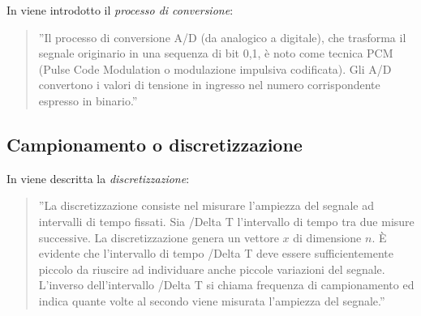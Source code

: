 \documentclass[a4paper]{report} %
\begin{document}
In \cite{art:rif.7} viene introdotto il \textit{processo di conversione}: 
\begin{quote}
	''Il processo di conversione A/D (da analogico a digitale), che trasforma il segnale originario in una sequenza di bit {0,1}, è noto come tecnica PCM (Pulse Code Modulation o modulazione impulsiva codificata). Gli A/D convertono i valori di tensione in ingresso nel numero corrispondente espresso in binario.''
\end{quote}
 
\subsection{Campionamento o discretizzazione}
In \cite{art:rif.2} viene descritta la \textit{discretizzazione}:
\begin{quote}
	''La discretizzazione consiste nel misurare l'ampiezza del segnale ad intervalli di tempo fissati. Sia /Delta T l'intervallo di tempo tra due misure successive. La discretizzazione genera un vettore $x$ di dimensione $n$. È evidente che l'intervallo di tempo /Delta T deve essere sufficientemente piccolo da riuscire ad individuare anche piccole variazioni del segnale. L'inverso dell'intervallo /Delta T si chiama frequenza di campionamento ed indica quante volte al secondo viene misurata l'ampiezza del segnale.'' 
\end{quote}
  
\end{document}
